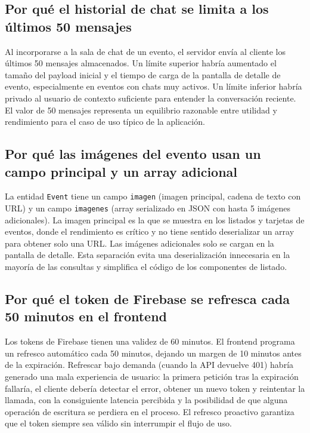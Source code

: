 \subsection{Por qué el historial de chat se limita a los últimos 50 mensajes}

Al incorporarse a la sala de chat de un evento, el servidor envía al cliente los últimos 50 mensajes almacenados. Un límite superior habría aumentado el tamaño del payload inicial y el tiempo de carga de la pantalla de detalle de evento, especialmente en eventos con chats muy activos. Un límite inferior habría privado al usuario de contexto suficiente para entender la conversación reciente. El valor de 50 mensajes representa un equilibrio razonable entre utilidad y rendimiento para el caso de uso típico de la aplicación.

\subsection{Por qué las imágenes del evento usan un campo principal y un array adicional}

La entidad \texttt{Event} tiene un campo \texttt{imagen} (imagen principal, cadena de texto con URL) y un campo \texttt{imagenes} (array serializado en JSON con hasta 5 imágenes adicionales). La imagen principal es la que se muestra en los listados y tarjetas de eventos, donde el rendimiento es crítico y no tiene sentido deserializar un array para obtener solo una URL. Las imágenes adicionales solo se cargan en la pantalla de detalle. Esta separación evita una deserialización innecesaria en la mayoría de las consultas y simplifica el código de los componentes de listado.

\subsection{Por qué el token de Firebase se refresca cada 50 minutos en el frontend}

Los tokens de Firebase tienen una validez de 60 minutos. El frontend programa un refresco automático cada 50 minutos, dejando un margen de 10 minutos antes de la expiración. Refrescar bajo demanda (cuando la API devuelve 401) habría generado una mala experiencia de usuario: la primera petición tras la expiración fallaría, el cliente debería detectar el error, obtener un nuevo token y reintentar la llamada, con la consiguiente latencia percibida y la posibilidad de que alguna operación de escritura se perdiera en el proceso. El refresco proactivo garantiza que el token siempre sea válido sin interrumpir el flujo de uso.

